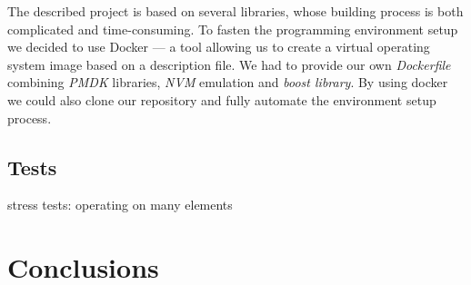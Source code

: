         The described project is based on several libraries, whose building process is both complicated and time-consuming.
        To fasten the programming environment setup we decided to use Docker \cite{Docker} --- a tool allowing us to create a virtual operating system image based on a description file.
        We had to provide our own \textit{Dockerfile} combining \textit{PMDK} libraries, \textit{NVM} emulation and \textit{boost library}.
        By using docker we could also clone our repository and fully automate the environment setup process.
        
    
    \subsection{Tests}
    stress tests: operating on many elements

\section{Conclusions}

